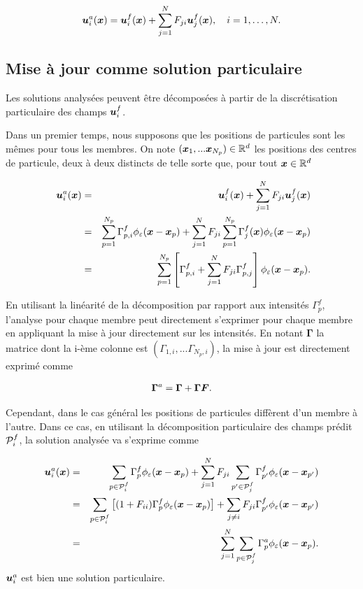 \begin{equation}
    \bm{u}_i^a(\bm{x}) =\bm{u}_i^f(\bm{x}) + \sum_{j=1}^{N} F_{ji} \bm{u}_j ^f(\bm{x}), \quad i = 1, \dots, N.
\end{equation}

\subsection{Mise à jour comme solution particulaire}

Les solutions analysées peuvent être décomposées à partir de la discrétisation particulaire des champs $\bm{u}_i^f$.

Dans un premier temps, nous supposons que les positions de particules sont les mêmes pour tous les membres. On note $(\bm{x}_1,...\bm{x}_{N_p}) \in \mathbb{R}^d$ les positions des centres de particule, deux à deux distincts de telle sorte que, pour tout $\bm{x} \in \mathbb{R}^d$

\begin{eqnarray*}~\label{eq:enkf_formula_same_part}
    \bm{u}_i^a(\bm{x}) &=& \bm{u}_i^f(\bm{x}) + \sum_{j=1}^{N} F_{ji} \bm{u}_j ^f(\bm{x}) \\
    &=& \sum_{p=1}^{N_p} \Gamma^f_{p,i} \phi_{\varepsilon}(\bm{x} - \bm{x}_p) + \sum_{j=1}^{N} F_{ji} \sum_{p=1}^{N_p} \Gamma_j ^f(\bm{x}) \phi_{\varepsilon}(\bm{x} - \bm{x}_p) \\
    &=& \sum_{p=1}^{N_p} \left[\Gamma^f_{p,i} + \sum_{j=1}^{N} F_{ji} \Gamma^f_{p,j} \right] \phi_{\varepsilon}(\bm{x} - \bm{x}_p).
\end{eqnarray*}

En utilisant la linéarité de la décomposition par rapport aux intensités $\Gamma^f_{p}$, l'analyse pour chaque membre peut directement s'exprimer pour chaque membre en appliquant la mise à jour directement sur les intensités. En notant $\bm \Gamma$ la matrice dont la i-ème colonne est $(\Gamma_{1, i},...\Gamma_{N_p, i})$, la mise à jour est directement exprimé comme

\begin{equation*}
    \bm \Gamma^a = \bm \Gamma + \bm \Gamma \bm{F}.
\end{equation*}

Cependant, dans le cas général les positions de particules diffèrent d'un membre à l'autre. Dans ce cas, en utilisant la décomposition particulaire des champs prédit $\mathcal{P}_i^f$, la solution analysée va s'exprime comme

\begin{eqnarray*}
    \bm{u}_i^a(\bm{x}) &=& \sum_{p \in \mathcal{P}_i^f}\Gamma^f_p \phi_{\varepsilon}(\bm{x} - \bm{x}_p) + \sum_{j=1}^{N} F_{ji}  \sum_{p' \in \mathcal{P}_j^f}\Gamma^f_{p'} \phi_{\varepsilon}(\bm{x} - \bm{x}_{p'}) \\
    &=& \sum_{p \in \mathcal{P}_i^f}\left[(1 + F_{ii})\Gamma^f_p \phi_{\varepsilon}(\bm{x} - \bm{x}_{p})\right]   + \sum_{j\neq i} F_{ji} \Gamma^f_{p'} \phi_{\varepsilon}(\bm{x} - \bm{x}_{p'})\\
    &=& \sum_{j=1}^{N} \sum_{p \in \mathcal{P}_j^f} \Gamma^a_p \phi_{\varepsilon}(\bm{x} - \bm{x}_p).
\end{eqnarray*}
$\bm{u}_i^a$ est bien une solution particulaire.


